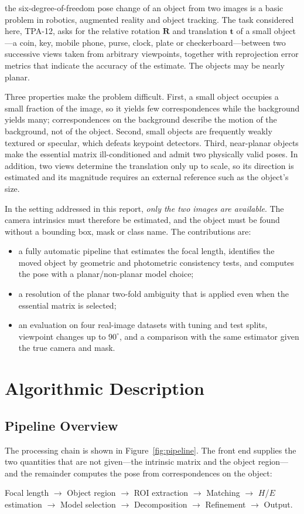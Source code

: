 \documentclass[journal]{IEEEtran}
\newcommand{\R}{\mathbf{R}}
\newcommand{\tv}{\mathbf{t}}
\begin{document}
 the six-degree-of-freedom pose change of an object from two images is a basic problem in robotics, augmented reality and object tracking. The task considered here, TPA-12, asks for the relative rotation $\R$ and translation $\tv$ of a small object---a coin, key, mobile phone, purse, clock, plate or checkerboard---between two successive views taken from arbitrary viewpoints, together with reprojection error metrics that indicate the accuracy of the estimate. The objects may be nearly planar.

Three properties make the problem difficult. First, a small object occupies a small fraction of the image, so it yields few correspondences while the background yields many; correspondences on the background describe the motion of the background, not of the object. Second, small objects are frequently weakly textured or specular, which defeats keypoint detectors. Third, near-planar objects make the essential matrix ill-conditioned and admit two physically valid poses. In addition, two views determine the translation only up to scale, so its direction is estimated and its magnitude requires an external reference such as the object's size.

In the setting addressed in this report, \emph{only the two images are available}. The camera intrinsics must therefore be estimated, and the object must be found without a bounding box, mask or class name. The contributions are:
\begin{itemize}
  \item a fully automatic pipeline that estimates the focal length, identifies the moved object by geometric and photometric consistency tests, and computes the pose with a planar/non-planar model choice;
  \item a resolution of the planar two-fold ambiguity that is applied even when the essential matrix is selected;
  \item an evaluation on four real-image datasets with tuning and test splits, viewpoint changes up to $90^\circ$, and a comparison with the same estimator given the true camera and mask.
\end{itemize}

\section{Algorithmic Description}

\subsection{Pipeline Overview}
The processing chain is shown in Figure~\ref{fig:pipeline}. The front end supplies the two quantities that are not given---the intrinsic matrix and the object region---and the remainder computes the pose from correspondences on the object:
\begin{center}\small
Focal length $\rightarrow$ Object region $\rightarrow$ ROI extraction $\rightarrow$ Matching $\rightarrow$ $H$/$E$ estimation $\rightarrow$ Model selection $\rightarrow$ Decomposition $\rightarrow$ Refinement $\rightarrow$ Output.
\end{center}
\end{document}
